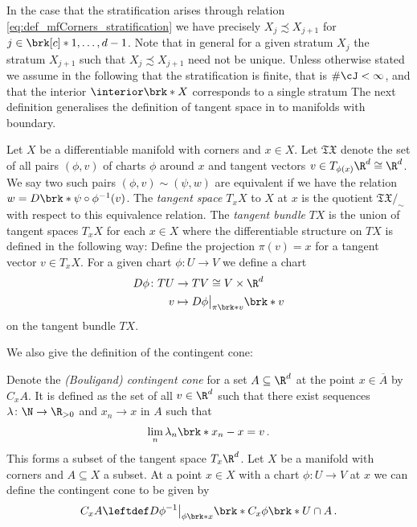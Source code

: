 In the case that the stratification arises through relation \eqref{eq:def_mfCorners_stratification}
we have precisely $X_{j}\precsim X_{j+1}$ for $j\in\brk[c]*{1,\dots,d-1}$.
Note that in general for a given stratum $X_j$ the stratum $X_{j+1}$ such that $X_j\precsim X_{j+1}$ need not be unique.
Unless otherwise stated we assume in the following that the stratification is finite, that is $\#\cJ<\infty$, and 
that the interior $\openX$ corresponds to a single stratum
%
The next definition generalises the definition of tangent space in \cite[§1.2]{Jost2002} to manifolds with boundary.
\begin{definition}
  \label{df:tangentSpace}
  Let $X$ be a differentiable manifold with corners and $x\in X$. Let $\mathfrak{TX}$ denote the set of all
  pairs $(\phi,v)$ of charts $\phi$ around $x$ and tangent vectors
  $v\in T_{\phi(x)}\R^d\cong \R^d$. We say two such pairs $(\phi,v)\sim (\psi,w)$ are equivalent if
  we have the relation $w=D\brk*{\psi\circ\phi^{-1}}(v)$. The \emph{tangent space $T_xX$} to $X$ at $x$ is the quotient
  ${\mathfrak{TX}}\big/_{\sim}$ with respect to this equivalence relation.
  The \emph{tangent bundle} $TX$ is the union of tangent spaces $T_xX$ for each $x\in X$ where 
  the differentiable structure on $TX$ is defined in the following way:
  Define the projection $\pi(v)=x$ for a tangent vector $v\in T_xX$.
  For a given chart $\phi\colon U\to V$ we define a chart
  \begin{align*} 
    D\phi\colon TU&\to TV\cong V\times\R^d\\
    v&\mapsto D\phi\big\vert_{\pi\brk*{v}}\brk*{v}
  \end{align*}
  on the tangent bundle $TX$.
\end{definition}
We also give the definition of the contingent cone:
\begin{definition}
  \label{df:contingentCone}
  Denote the \emph{(Bouligand) contingent cone} for a set $A\subseteq \R^d$ at the point $x\in\overline{A}$ by $C_xA$.
  It is defined as the set of all $v\in\R^d$ such that there exist sequences $\lambda\colon\N\to\R_{>0}$ and $x_n\to x$ in
  $A$ such that
  $$\lim_n\lambda_n\brk*{x_n-x}=v\,.$$
  This forms a subset of the tangent space $T_x\R^d$.
  Let $X$ be a manifold with corners and $A\subseteq X$ a subset. At a point $x\in X$ with a chart $\phi\colon U\to V$ at $x$ we can define the 
  contingent cone to be given by $$C_xA\leftdef D\phi^{-1}\big\vert_{\phi\brk*{x}}\brk*{C_x\phi\brk*{U\cap A}}\,.$$
\end{definition}

